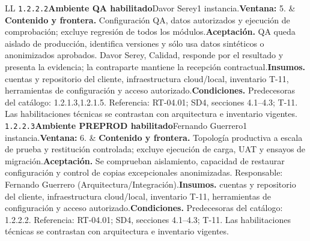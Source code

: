 \begin{longtable}{L{\tabcolsep\relax}L{\tabcolsep\relax}}
\texttt{1.\allowbreak{}2.\allowbreak{}2.\allowbreak{}2}\newline{}\textbf{Ambiente QA habilitado}\newline{}Davor Serey\newline{}1 instancia.\newline{}\textbf{Ventana:} 5. & \textbf{Contenido y frontera.} Configuración QA, datos autorizados y ejecución de comprobación; excluye regresión de todos los módulos.\newline{}\textbf{Aceptación.} QA queda aislado de producción, identifica versiones y sólo usa datos sintéticos o anonimizados aprobados. Davor Serey, Calidad, responde por el resultado y presenta la evidencia; la contraparte mantiene la recepción contractual.\newline{}\textbf{Insumos.} cuentas y repositorio del cliente, infraestructura cloud/local, inventario T-11, herramientas de configuración y acceso autorizado.\newline{}\textbf{Condiciones.} Predecesoras del catálogo: 1.2.1.3,1.2.1.5. Referencia: RT-04.01; SD4, secciones 4.1--4.3; T-11. Las habilitaciones técnicas se contrastan con arquitectura e inventario vigentes.\\\hline
\texttt{1.\allowbreak{}2.\allowbreak{}2.\allowbreak{}3}\newline{}\textbf{Ambiente PREPROD habilitado}\newline{}Fernando Guerrero\newline{}1 instancia.\newline{}\textbf{Ventana:} 6. & \textbf{Contenido y frontera.} Topología productiva a escala de prueba y restitución controlada; excluye ejecución de carga, UAT y ensayos de migración.\newline{}\textbf{Aceptación.} Se comprueban aislamiento, capacidad de restaurar configuración y control de copias excepcionales anonimizadas. Responsable: Fernando Guerrero (Arquitectura/Integración).\newline{}\textbf{Insumos.} cuentas y repositorio del cliente, infraestructura cloud/local, inventario T-11, herramientas de configuración y acceso autorizado.\newline{}\textbf{Condiciones.} Predecesoras del catálogo: 1.2.2.2. Referencia: RT-04.01; SD4, secciones 4.1--4.3; T-11. Las habilitaciones técnicas se contrastan con arquitectura e inventario vigentes.\\\hline

\end{longtable}
